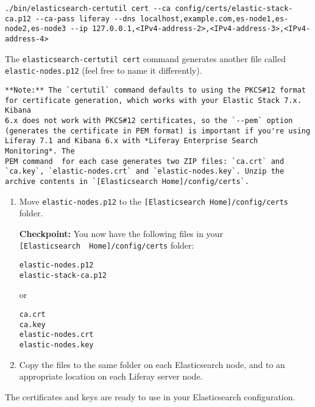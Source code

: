 \begin{enumerate}
\begin{verbatim}
./bin/elasticsearch-certutil cert --ca config/certs/elastic-stack-ca.p12 --ca-pass liferay --dns localhost,example.com,es-node1,es-node2,es-node3 --ip 127.0.0.1,<IPv4-address-2>,<IPv4-address-3>,<IPv4-address-4>
\end{verbatim}

  The \texttt{elasticsearch-certutil\ cert} command generates another
  file called \texttt{elastic-nodes.p12} (feel free to name it
  differently).
\end{enumerate}

\noindent\hrulefill

\begin{verbatim}
**Note:** The `certutil` command defaults to using the PKCS#12 format
for certificate generation, which works with your Elastic Stack 7.x. Kibana
6.x does not work with PKCS#12 certificates, so the `--pem` option
(generates the certificate in PEM format) is important if you're using
Liferay 7.1 and Kibana 6.x with *Liferay Enterprise Search Monitoring*. The
PEM command  for each case generates two ZIP files: `ca.crt` and
`ca.key`, `elastic-nodes.crt` and `elastic-nodes.key`. Unzip the
archive contents in `[Elasticsearch Home]/config/certs`.
\end{verbatim}

\noindent\hrulefill

\begin{enumerate}
\def\labelenumi{\arabic{enumi}.}
\item
  Move \texttt{elastic-nodes.p12} to the
  \texttt{{[}Elasticsearch\ Home{]}/config/certs} folder.

  \textbf{Checkpoint:} You now have the following files in your
  \texttt{{[}Elasticsearch\ \ Home{]}/config/certs} folder:

\begin{verbatim}
elastic-nodes.p12
elastic-stack-ca.p12
\end{verbatim}

  or

\begin{verbatim}
ca.crt
ca.key
elastic-nodes.crt
elastic-nodes.key
\end{verbatim}
\item
  Copy the files to the same folder on each Elasticsearch node, and to
  an appropriate location on each Liferay server node.
\end{enumerate}

The certificates and keys are ready to use in your Elasticsearch
configuration.

